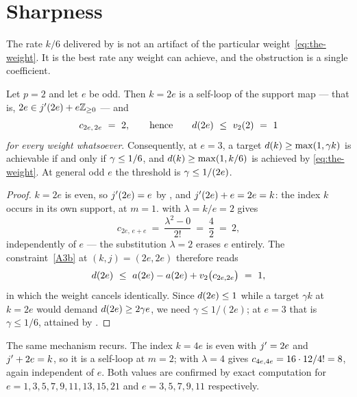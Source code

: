 
\section{Sharpness}
\label{sec:sharpness}

The rate $k/6$ delivered by  is not an artifact of the
particular weight~\eqref{eq:the-weight}. It is the best rate any weight can
achieve, and the obstruction is a single coefficient.

\begin{theorem}[Sharpness]
\label{thm:sharpness}
Let $p = 2$ and let $e$ be odd. Then $k = 2e$ is a self-loop of the support
map --- that is, $2e \in j'(2e) + e\mathbb{Z}_{\ge 0}$ --- and
\[
  c_{2e,\,2e} \ = \ 2,
  \qquad\text{hence}\qquad
  d(2e) \ \le \ v_2(2) \ = \ 1
\]
\emph{for every weight whatsoever}. Consequently, at $e = 3$, a target
$d(k) \ge \max(1, \gamma k)$ is achievable if and only if $\gamma \le
1/6$, and $d(k) \ge \max(1, k/6)$ is achieved by
\eqref{eq:the-weight}. At general odd $e$ the threshold is $\gamma \le
1/(2e)$.
\end{theorem}

\begin{proof}
$k = 2e$ is even, so $j'(2e) = e$ by , and $j'(2e) + e =
2e = k$: the index $k$ occurs in its own support, at $m = 1$.
 with $\lambda = k/e = 2$ gives
\[
  c_{2e,\,e+e} \ = \ \frac{\lambda^2 - 0}{2!} \ = \ \frac{4}{2} \ = \ 2,
\]
independently of $e$ --- the substitution $\lambda = 2$ erases $e$
entirely. The constraint~\ref{A3b} at $(k,j) = (2e,2e)$ therefore reads
\[
  d(2e) \ \le \ a(2e) - a(2e) + v_2\bigl(c_{2e,2e}\bigr) \ = \ 1,
\]
in which the weight cancels identically. Since $d(2e) \le 1$ while a
target $\gamma k$ at $k = 2e$ would demand $d(2e) \ge 2\gamma e$, we
need $\gamma \le 1/(2e)$; at $e = 3$ that is $\gamma \le 1/6$, attained by
.
\end{proof}

The same mechanism recurs. The index $k = 4e$ is even with $j' = 2e$ and
$j' + 2e = k$, so it is a self-loop at $m = 2$;  with
$\lambda = 4$ gives $c_{4e,4e} = 16 \cdot 12/4! = 8$, again
independent of $e$. Both values are confirmed by exact computation for
$e = 1,3,5,7,9,11,13,15,21$ and $e = 3,5,7,9,11$ respectively.

